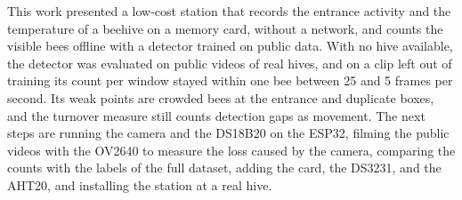 \documentclass[english,hidelinks]{sbrt}
\begin{document}
This work presented a low-cost station that records the entrance activity and the temperature of a beehive on a memory card, without a network, and counts the visible bees offline with a detector trained on public data. With no hive available, the detector was evaluated on public videos of real hives, and on a clip left out of training its count per window stayed within one bee between 25 and 5 frames per second. Its weak points are crowded bees at the entrance and duplicate boxes, and the turnover measure still counts detection gaps as movement. The next steps are running the camera and the DS18B20 on the ESP32, filming the public videos with the OV2640 to measure the loss caused by the camera, comparing the counts with the labels of the full dataset, adding the card, the DS3231, and the AHT20, and installing the station at a real hive.



\end{document}
